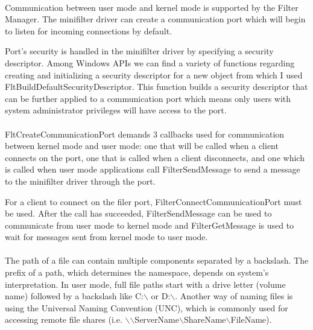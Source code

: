 		\paragraph{}
		Communication between user mode and kernel mode is supported by the Filter Manager. The minifilter driver can create a communication port which will begin to listen for incoming connections by default. 
		
		Port's security is handled in the minifilter driver by specifying a security descriptor. Among  Windows APIs we can find a variety of functions regarding creating and initializing a security descriptor for a new object from which I used FltBuildDefaultSecurityDescriptor. This function builds a security descriptor that can be further applied to a communication port which means only users with system administrator privileges will have access to the port\cite{MSDNCommunication}.
		
		\paragraph{}
		FltCreateCommunicationPort demands 3 callbacks used for communication between kernel mode and user mode: one that will be called when a client connects on the port, one that is called when a client disconnects, and one which is called when user mode applications call FilterSendMessage to send a message to the minifilter driver through the port\cite{MSDNCommunication}.
		

		For a client to connect on the filer port, FilterConnectCommunicationPort must be used. After the call has succeeded, FilterSendMessage can be used to communicate from user mode to kernel mode and FilterGetMessage is used to wait for messages sent from kernel mode to user mode\cite{MSDNCommunication}.
		
		
		\paragraph{}
		The path of a file can contain multiple components separated by a backslash. The prefix of a path, which determines the namespace, depends on system's interpretation. In user mode, full file paths start with a drive letter (volume name) followed by a backslash like C:$\backslash$ or D:$\backslash$. Another way of naming files is using the Universal Naming Convention (UNC), which is commonly used for accessing remote file shares (i.e. $\backslash$$\backslash$ServerName$\backslash$ShareName$\backslash$FileName).
		
